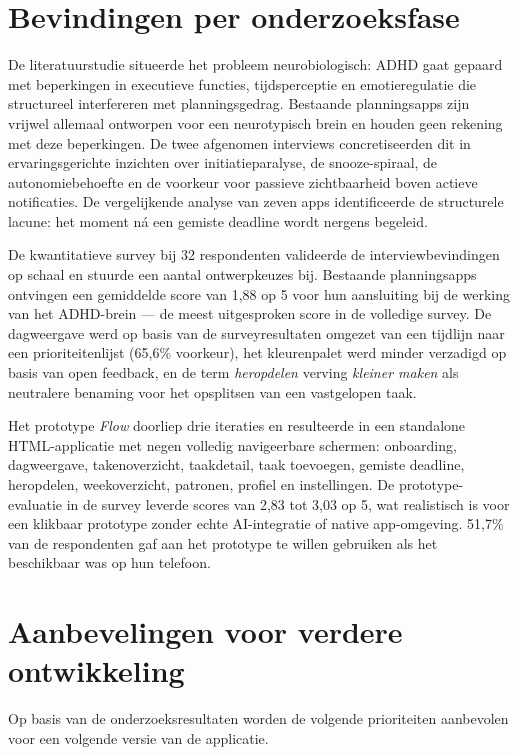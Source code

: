 \section{Bevindingen per onderzoeksfase}

De literatuurstudie situeerde het probleem neurobiologisch: ADHD gaat gepaard
met beperkingen in executieve functies, tijdsperceptie en emotieregulatie die
structureel interfereren met planningsgedrag. Bestaande planningsapps zijn
vrijwel allemaal ontworpen voor een neurotypisch brein en houden geen rekening
met deze beperkingen. De twee afgenomen interviews concretiseerden dit in
ervaringsgerichte inzichten over initiatieparalyse, de snooze-spiraal, de
autonomiebehoefte en de voorkeur voor passieve zichtbaarheid boven actieve
notificaties. De vergelijkende analyse van zeven apps identificeerde de
structurele lacune: het moment ná een gemiste deadline wordt nergens begeleid.

De kwantitatieve survey bij 32 respondenten valideerde de interviewbevindingen
op schaal en stuurde een aantal ontwerpkeuzes bij. Bestaande planningsapps
ontvingen een gemiddelde score van 1,88 op 5 voor hun aansluiting bij de
werking van het ADHD-brein — de meest uitgesproken score in de volledige survey.
De dagweergave werd op basis van de surveyresultaten omgezet van een tijdlijn
naar een prioriteitenlijst (65,6\% voorkeur), het kleurenpalet werd minder
verzadigd op basis van open feedback, en de term \textit{heropdelen} verving
\textit{kleiner maken} als neutralere benaming voor het opsplitsen van een
vastgelopen taak.

Het prototype \textit{Flow} doorliep drie iteraties en resulteerde in een
standalone HTML-applicatie met negen volledig navigeerbare schermen: onboarding,
dagweergave, takenoverzicht, taakdetail, taak toevoegen, gemiste deadline,
heropdelen, weekoverzicht, patronen, profiel en instellingen. De
prototype-evaluatie in de survey leverde scores van 2,83 tot 3,03 op 5, wat
realistisch is voor een klikbaar prototype zonder echte AI-integratie of native
app-omgeving. 51,7\% van de respondenten gaf aan het prototype te willen
gebruiken als het beschikbaar was op hun telefoon.

\section{Aanbevelingen voor verdere ontwikkeling}

Op basis van de onderzoeksresultaten worden de volgende prioriteiten aanbevolen
voor een volgende versie van de applicatie.


